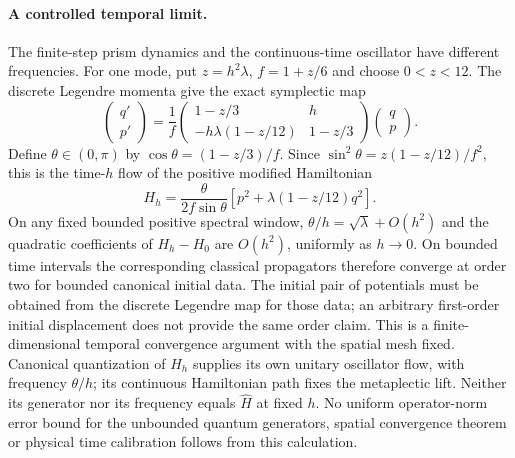 \paragraph{A controlled temporal limit.}
The finite-step prism dynamics and the continuous-time oscillator have
different frequencies. For one mode, put \(z=h^2\lambda\),
\(f=1+z/6\) and choose \(0<z<12\). The discrete Legendre momenta
give the exact symplectic map
\[
 \begin{pmatrix}q'\\p'\end{pmatrix}
 =\frac1f\begin{pmatrix}
 1-z/3&h\\-h\lambda(1-z/12)&1-z/3
 \end{pmatrix}\begin{pmatrix}q\\p\end{pmatrix}.
\]
Define \(\theta\in(0,\pi)\) by
\(\cos\theta=(1-z/3)/f\). Since
\(\sin^2\theta=z(1-z/12)/f^2\), this is the time-\(h\)
flow of the positive modified Hamiltonian
\[
 H_h=\frac{\theta}{2f\sin\theta}
        \left[p^2+\lambda(1-z/12)q^2\right].
\]
On any fixed bounded positive spectral window,
\(\theta/h=\sqrt\lambda+O(h^2)\) and the quadratic coefficients
of \(H_h-H_0\) are \(O(h^2)\), uniformly as \(h\to0\).
On bounded time intervals the corresponding classical propagators
therefore converge at order two for bounded canonical initial data.
The initial pair of potentials must be obtained from the discrete
Legendre map for those data; an arbitrary first-order initial displacement
does not provide the same order claim. This is a finite-dimensional
temporal convergence argument with the spatial mesh fixed.
Canonical quantization of \(H_h\) supplies its own unitary oscillator
flow, with frequency \(\theta/h\); its continuous Hamiltonian path
fixes the metaplectic lift. Neither its generator nor its frequency equals
\(\widehat H\) at fixed \(h\). No uniform operator-norm error bound
for the unbounded quantum generators, spatial convergence theorem or
physical time calibration follows from this calculation.
